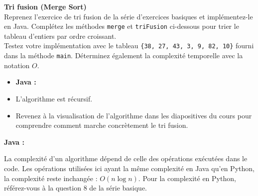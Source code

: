 \begin{Exercice} [20 minutes] [Java] \textbf{Tri fusion (Merge Sort)} \\
    Reprenez l'exercice de tri fusion de la série d'exercices basiques et implémentez-le en Java. Complétez les méthodes \texttt{merge} et \texttt{triFusion} ci-dessous pour trier le tableau d'entiers par ordre croissant. \\
    
    Testez votre implémentation avec le tableau \texttt{\{38, 27, 43, 3, 9, 82, 10\}} fourni dans la méthode \texttt{main}. Déterminez également la complexité temporelle avec la notation $O$.
    
    \begin{itemize}
        \item \textbf{Java :}
            
    \end{itemize}
    
    \begin{conseil}
    \begin{itemize}
        \item L'algorithme est récursif. 
        \item Revenez à la visualisation de l'algorithme dans les diapositives du cours pour comprendre comment marche concrètement le tri fusion. 
    \end{itemize}
    
    \end{conseil}
    
     \begin{solution}
        \textbf{Java :}
        
    \end{solution}
    \begin{solution}
        
    \end{solution}
    \begin{solution}
        
        La complexité d'un algorithme dépend de celle des opérations exécutées dans le code. Les opérations utilisées ici ayant la même complexité en Java qu'en Python, la complexité reste inchangée : $O(n \log n)$. Pour la complexité en Python, référez-vous à la question 8 de la série basique. 
    \end{solution}
\end{Exercice}





